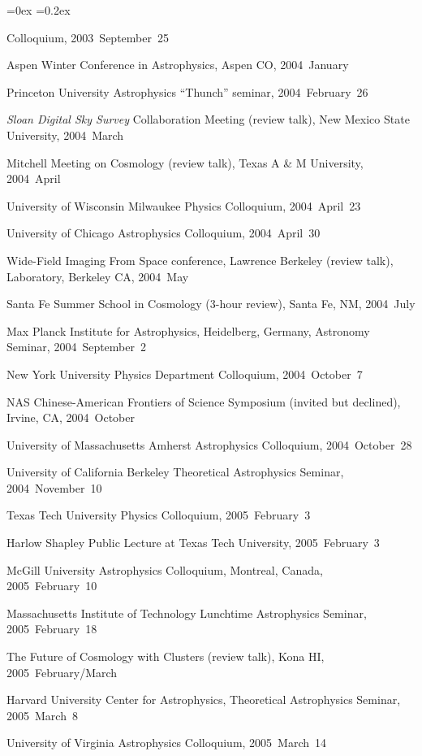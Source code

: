 \documentclass[12pt,letterpaper]{article}
\newcommand{\project}[1]{\textsl{#1}}
\newcounter{refpubnum}
\newcommand{\hogglist}{%
    \rightmargin=0in
    \leftmargin=0.18in
    \topsep=0ex
    \partopsep=0pt
    \itemsep=0.2ex
    \parsep=0pt
    \itemindent=-1.0\leftmargin
    \listparindent=0.0\leftmargin
    \settowidth{\labelsep}{~}
    \usecounter{refpubnum}
  }
\begin{document}
\begin{list}{}{\hogglist}
{          Colloquium,
          2003~September~25
\item Aspen Winter Conference in Astrophysics, Aspen CO,
          2004~January
\item Princeton University Astrophysics ``Thunch'' seminar,
          2004~February~26
\item \project{Sloan Digital Sky Survey} Collaboration Meeting (review talk),
          New Mexico State University, 2004~March
\item Mitchell Meeting on Cosmology (review talk), Texas A \& M University, 2004~April 
\item University of Wisconsin Milwaukee Physics Colloquium, 2004~April~23
\item University of Chicago Astrophysics Colloquium, 2004~April~30
\item Wide-Field Imaging From Space conference, Lawrence Berkeley
          (review talk), Laboratory, Berkeley CA, 2004~May
\item Santa Fe Summer School in Cosmology (3-hour review), Santa Fe, NM,
          2004~July
\item Max Planck Institute for Astrophysics, Heidelberg, Germany, Astronomy Seminar, 2004~September~2
\item New York University Physics Department Colloquium, 2004~October~7
\item NAS Chinese-American Frontiers of Science Symposium (invited but declined), Irvine, CA, 2004~October
\item University of Massachusetts Amherst Astrophysics Colloquium, 2004~October~28
\item University of California Berkeley Theoretical Astrophysics Seminar, 2004~November~10
\item Texas Tech University Physics Colloquium, 2005~February~3
\item Harlow Shapley Public Lecture at Texas Tech University, 2005~February~3
\item McGill University Astrophysics Colloquium, Montreal, Canada, 2005~February~10
\item Massachusetts Institute of Technology Lunchtime Astrophysics Seminar, 2005~February~18
\item The Future of Cosmology with Clusters (review talk), Kona HI, 2005~February/March
\item Harvard University Center for Astrophysics, Theoretical Astrophysics Seminar, 2005~March~8
\item University of Virginia Astrophysics Colloquium, 2005~March~14
}
\end{list}
\end{document}
